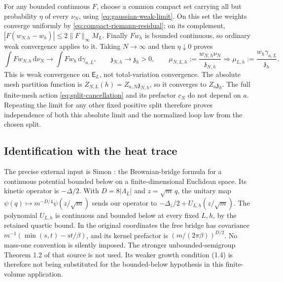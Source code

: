\documentclass[11pt]{article}
\numberwithin{equation}{section}
\theoremstyle{definition}
\newcommand{\dd}{\,\mathrm d}
\begin{document}
For any bounded continuous $F$, choose a common compact set carrying all
but probability $\eta$ of every $\nu_N$, using
\eqref{eq:gaussian-weak-limit}. On this set the weights converge uniformly
by \eqref{eq:compact-riemann-residual}; on its complement,
$|F(w_{N,h}-w_h)|\leq2\|F\|_\infty M_L$.  Finally $Fw_h$ is bounded
continuous, so ordinary weak convergence applies to it. Taking $N\to\infty$
and then $\eta\downarrow0$ proves
\begin{equation}
 \int Fw_{N,h}\dd\nu_N\longrightarrow
       \int Fw_h\dd\gamma_{a,L},\qquad
 \mathfrak z_{N,h}\longrightarrow\mathfrak z_h>0,
 \qquad
 \mu_{N,L,h}:=\frac{w_{N,h}\nu_N}{\mathfrak z_{N,h}}
       \Longrightarrow\mu_{L,h}:=\frac{w_h\gamma_{a,L}}{\mathfrak z_h}.
 \label{eq:weighted-loop-limit}
\end{equation}
This is weak convergence on $\mathsf E_L$, not total-variation convergence.
The absolute mesh partition function is $Z_{N,L}(h)=Z_{a,N}\mathfrak z_{N,h}$,
so it converges to $Z_a\mathfrak z_h$.  The full finite-mesh action
\eqref{eq:split-cancellation} and its prefactor $c_N$ do not depend on $a$.
Repeating the limit for any other fixed positive split therefore proves
independence of both this absolute limit and the normalized loop law from
the chosen split.

\subsection{Identification with the heat trace}
\label{sec:fk-identification}

The precise external input is Simon \cite[Theorem 1.1, (1.1)--(1.3),
page 2]{Simon-FK}: the Brownian-bridge formula for a continuous potential
bounded below on a finite-dimensional Euclidean space. Its kinetic
operator is $-\Delta/2$. With $D=8|\Lambda_L|$ and $z=\sqrt m\,q$,
the unitary map $\psi(q)\mapsto m^{-D/4}\psi(z/\sqrt m)$ sends our
operator to $-\Delta_z/2+U_{L,h}(z/\sqrt m)$. The polynomial $U_{L,h}$ is
continuous and bounded below at every fixed $L,h$, by the retained quartic
bound. In the original coordinates the free bridge has covariance
$m^{-1}(\min(s,t)-st/\beta)$, and its kernel prefactor is
$(m/(2\pi\beta))^{D/2}$. No mass-one convention is silently imposed.
The stronger unbounded-semigroup Theorem 1.2 of that source is not used. Its weaker growth condition (1.4) is therefore not being substituted for the bounded-below hypothesis in this finite-volume application.
\end{document}
